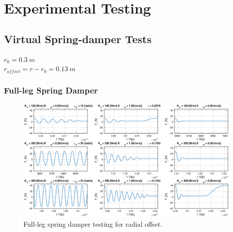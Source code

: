 \chapter{Experimental Testing}
\label{chap:Experimental Testing}

\section{Virtual Spring-damper Tests} 
\label{sec:Virtual Spring-damper Tests}
$r_0 = 0.3\ m$\\
$r_{offset} = r - r_0 = 0.13\ m$

\subsection{Full-leg Spring Damper}

\begin{figure}
\centering
\includegraphics[width=1\textwidth]{images/experiments/spring-damper-tests2.eps} 
\caption{Full-leg spring damper testing for radial offset.}
\label{fig:spring-damper-tests}
\end{figure}

